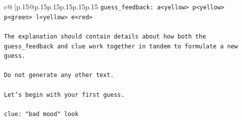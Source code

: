 \documentclass{article}
\begin{document}
{\begin{supertabular}{c@{$\;$}|p{.15\linewidth}@{}p{.15\linewidth}p{.15\linewidth}p{.15\linewidth}p{.15\linewidth}p{.15\linewidth}}
{{{\texttt{guess\_feedback: a<yellow> p<yellow> p<green> l<yellow> e<red>} \\
\\ 
\texttt{The explanation should contain details about how both the guess\_feedback and clue work together in tandem to formulate a new guess.} \\
\\ 
\texttt{Do not generate any other text.} \\
\\ 
\texttt{Let's begin with your first guess.} \\
\\ 
\texttt{clue: "bad mood" look} \\
            }
        }
    }
     \\ \\


\end{supertabular}}
\end{document}
